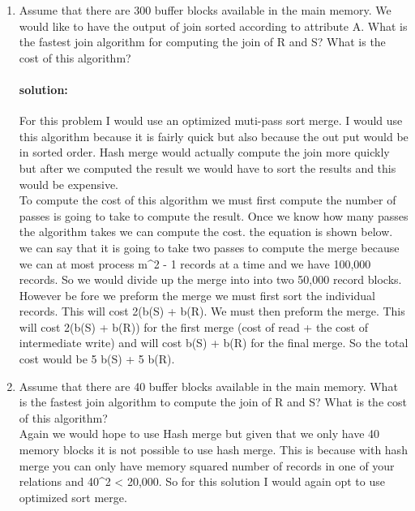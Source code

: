 \documentclass[11pt]{article}
\begin{document}
\begin{enumerate}
\item Assume that there are 300 buffer blocks available in the main memory. 
We would like to have the output of join sorted according to attribute A. 
What is the fastest join algorithm for computing the join of R and S? What is the cost of this algorithm? 

\paragraph{solution:} \hfill \break
For this problem I would use an optimized muti-pass sort merge. I would use this algorithm because it is fairly quick but also because the out put would be in sorted order. Hash merge would actually compute the join more quickly but after we computed the result we would have to sort the results and this would be expensive.\\

To compute the cost of this algorithm we must first compute the number of passes is going to take to compute the result. Once we know how many passes the algorithm takes we can compute the cost. the equation is shown below.\\
we can say that it is going to take two passes to compute the merge because we can at most process m^2 - 1 records at a time and we have 100,000 records. So we would divide up the merge into into two 50,000 record blocks. However be fore we preform the merge we must first sort the individual records. This will cost 2(b(S) + b(R). We must then preform the merge. This will cost 2(b(S) + b(R)) for the first merge (cost of read + the cost of intermediate write) and will cost b(S) + b(R) for the final merge. So the total cost would be 5 b(S) + 5 b(R).\\


\item Assume that there are 40 buffer blocks available in the main memory. 
What is the fastest join algorithm to compute the join of R and S? What is the cost of this algorithm? \\

 \hfill \break
Again we would hope to use Hash merge but given that we only have 40 memory blocks it is not possible to use hash merge. This is because with hash merge you can only have memory squared number of records in one of your relations and 40^2 < 20,000. So for this solution I would again opt to use optimized sort merge.\\


\end{enumerate}
\end{document}
